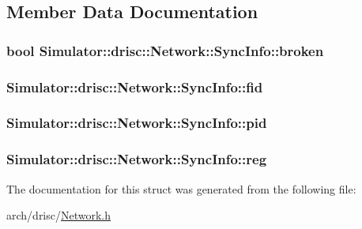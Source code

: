 \subsection{Member Data Documentation}
\hypertarget{struct_simulator_1_1drisc_1_1_network_1_1_sync_info_a81ddd6ff32745fa9b625a03132b3518d}{
\subsubsection[{broken}]{\setlength{\rightskip}{0pt plus 5cm}bool Simulator\+::drisc\+::\+Network\+::\+Sync\+Info\+::broken}}\label{struct_simulator_1_1drisc_1_1_network_1_1_sync_info_a81ddd6ff32745fa9b625a03132b3518d}
\hypertarget{struct_simulator_1_1drisc_1_1_network_1_1_sync_info_ab358f670dbf52acb1ebe12c67c1fda1c}{
\subsubsection[{fid}]{ Simulator\+::drisc\+::\+Network\+::\+Sync\+Info\+::fid}}\label{struct_simulator_1_1drisc_1_1_network_1_1_sync_info_ab358f670dbf52acb1ebe12c67c1fda1c}
\hypertarget{struct_simulator_1_1drisc_1_1_network_1_1_sync_info_a11efa6640ab7c49d56d52db68dc643ec}{
\subsubsection[{pid}]{ Simulator\+::drisc\+::\+Network\+::\+Sync\+Info\+::pid}}\label{struct_simulator_1_1drisc_1_1_network_1_1_sync_info_a11efa6640ab7c49d56d52db68dc643ec}
\hypertarget{struct_simulator_1_1drisc_1_1_network_1_1_sync_info_ae59081346f93289bf7a012e739100c56}{
\subsubsection[{reg}]{ Simulator\+::drisc\+::\+Network\+::\+Sync\+Info\+::reg}}\label{struct_simulator_1_1drisc_1_1_network_1_1_sync_info_ae59081346f93289bf7a012e739100c56}


The documentation for this struct was generated from the following file\+:\begin{DoxyCompactItemize}
\item 
arch/drisc/\hyperlink{_network_8h}{Network.\+h}\end{DoxyCompactItemize}
